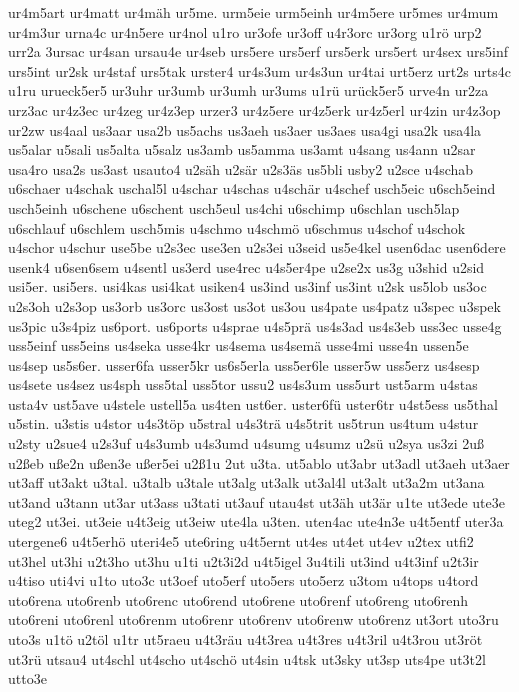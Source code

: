 {ur4m5art
ur4matt
ur4mäh
ur5me.
urm5eie
urm5einh
ur4m5ere
ur5mes
ur4mum
ur4m3ur
urna4c
ur4n5ere
ur4nol
u1ro
ur3ofe
ur3off
u4r3orc
ur3org
u1rö
urp2
urr2a
3ursac
ur4san
ursau4e
ur4seb
urs5ere
urs5erf
urs5erk
urs5ert
ur4sex
urs5inf
urs5int
ur2sk
ur4staf
urs5tak
urster4
ur4s3um
ur4s3un
ur4tai
urt5erz
urt2s
urts4c
u1ru
urueck5er5
ur3uhr
ur3umb
ur3umh
ur3ums
u1rü
urück5er5
urve4n
ur2za
urz3ac
ur4z3ec
ur4zeg
ur4z3ep
urzer3
ur4z5ere
ur4z5erk
ur4z5erl
ur4zin
ur4z3op
ur2zw
us4aal
us3aar
usa2b
us5achs
us3aeh
us3aer
us3aes
usa4gi
usa2k
usa4la
us5alar
u5sali
us5alta
u5salz
us3amb
us5amma
us3amt
u4sang
us4ann
u2sar
usa4ro
usa2s
us3ast
usauto4
u2säh
u2sär
u2s3äs
us5bli
usby2
u2sce
u4schab
u6schaer
u4schak
uschal5l
u4schar
u4schas
u4schär
u4schef
usch5eic
u6sch5eind
usch5einh
u6schene
u6schent
usch5eul
us4chi
u6schimp
u6schlan
usch5lap
u6schlauf
u6schlem
usch5mis
u4schmo
u4schmö
u6schmus
u4schof
u4schok
u4schor
u4schur
use5be
u2s3ec
use3en
u2s3ei
u3seid
us5e4kel
usen6dac
usen6dere
usenk4
u6sen6sem
u4sentl
us3erd
use4rec
u4s5er4pe
u2se2x
us3g
u3shid
u2sid
usi5er.
usi5ers.
usi4kas
usi4kat
usiken4
us3ind
us3inf
us3int
u2sk
us5lob
us3oc
u2s3oh
u2s3op
us3orb
us3orc
us3ost
us3ot
us3ou
us4pate
us4patz
u3spec
u3spek
us3pic
u3s4piz
us6port.
us6ports
u4sprae
u4s5prä
us4s3ad
us4s3eb
uss3ec
usse4g
uss5einf
uss5eins
us4seka
usse4kr
us4sema
us4semä
usse4mi
usse4n
ussen5e
us4sep
us5s6er.
usser6fa
usser5kr
us6s5erla
uss5er6le
usser5w
uss5erz
us4sesp
us4sete
us4sez
us4sph
uss5tal
uss5tor
ussu2
us4s3um
uss5urt
ust5arm
u4stas
usta4v
ust5ave
u4stele
ustell5a
us4ten
ust6er.
uster6fü
uster6tr
u4st5ess
us5thal
u5stin.
u3stis
u4stor
u4s3töp
u5stral
u4s3trä
u4s5trit
us5trun
us4tum
u4stur
u2sty
u2sue4
u2s3uf
u4s3umb
u4s3umd
u4sumg
u4sumz
u2sü
u2sya
us3zi
2uß
u2ßeb
uße2n
ußen3e
ußer5ei
u2ß1u
2ut
u3ta.
ut5ablo
ut3abr
ut3adl
ut3aeh
ut3aer
ut3aff
ut3akt
u3tal.
u3talb
u3tale
ut3alg
ut3alk
ut3al4l
ut3alt
ut3a2m
ut3ana
ut3and
u3tann
ut3ar
ut3ass
u3tati
ut3auf
utau4st
ut3äh
ut3är
u1te
ut3ede
ute3e
uteg2
ut3ei.
ut3eie
u4t3eig
ut3eiw
ute4la
u3ten.
uten4ac
ute4n3e
u4t5entf
uter3a
utergene6
u4t5erhö
uteri4e5
ute6ring
u4t5ernt
ut4es
ut4et
ut4ev
u2tex
utfi2
ut3hel
ut3hi
u2t3ho
ut3hu
u1ti
u2t3i2d
u4t5igel
3u4tili
ut3ind
u4t3inf
u2t3ir
u4tiso
uti4vi
u1to
uto3c
ut3oef
uto5erf
uto5ers
uto5erz
u3tom
u4tops
u4tord
uto6rena
uto6renb
uto6renc
uto6rend
uto6rene
uto6renf
uto6reng
uto6renh
uto6reni
uto6renl
uto6renm
uto6renr
uto6renv
uto6renw
uto6renz
ut3ort
uto3ru
uto3s
u1tö
u2töl
u1tr
ut5raeu
u4t3räu
u4t3rea
u4t3res
u4t3ril
u4t3rou
ut3röt
ut3rü
utsau4
ut4schl
ut4scho
ut4schö
ut4sin
u4tsk
ut3sky
ut3sp
uts4pe
ut3t2l
utto3e
}
